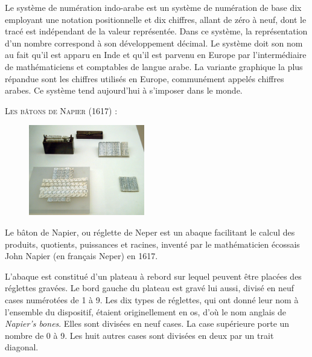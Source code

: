 Le système de numération indo-arabe est un système de numération de base dix employant une notation positionnelle et dix chiffres, allant de zéro à neuf, dont le tracé est indépendant de la valeur représentée. Dans ce système, la représentation d'un nombre correspond à son développement décimal. Le système doit son nom au fait qu'il est apparu en Inde et qu'il est parvenu en Europe par l'intermédiaire de mathématiciens et comptables de langue arabe. La variante graphique la plus répandue sont les chiffres utilisés en Europe, communément appelés chiffres arabes. Ce système tend aujourd’hui à s’imposer dans le monde.

\newpage

\textsc{ Les bâtons de Napier (1617) :} 

\vspace{.35cm}

\begin{figure} %
    \vspace{-0.75cm} %
    \includegraphics[width=0.45\textwidth]{../images/batons-napier.jpg}
\end{figure}

Le bâton de Napier, ou réglette de Neper est un abaque facilitant le calcul des produits, quotients, puissances et racines, inventé par le mathématicien écossais John Napier (en français Neper) en 1617.

L'abaque est constitué d'un plateau à rebord sur lequel peuvent être placées des réglettes gravées. Le bord gauche du plateau est gravé lui aussi, divisé en neuf cases numérotées de 1 à 9. Les dix types de réglettes, qui ont donné leur nom à l'ensemble du dispositif, étaient originellement en os, d'où le nom anglais de \textit{Napier's bones}. Elles sont divisées en neuf cases. La case supérieure porte un nombre de 0 à 9. Les huit autres cases sont divisées en deux par un trait diagonal.

\newpage

